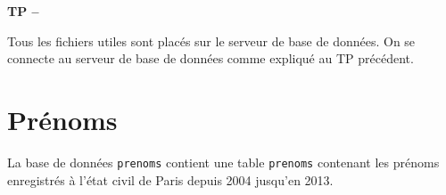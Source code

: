 

%



\begin{center}
{\Large\bf TP \no {\num} -- \descrip}
\end{center}
 
Tous les fichiers utiles sont placés sur le serveur de base de données. On se connecte au serveur de base de données comme expliqué au TP précédent.

% 
% 
%  
%  
%  
%  

\section{Prénoms}

La base de données \verb|prenoms| contient une table \verb|prenoms| contenant les prénoms enregistrés à l'état civil de Paris depuis 2004 jusqu'en 2013.

